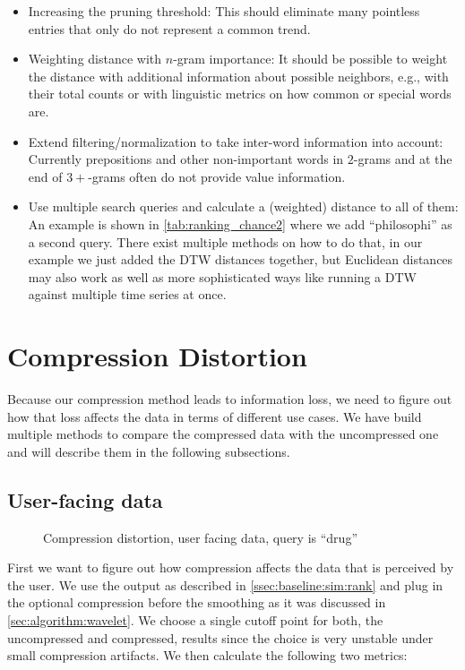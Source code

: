 \begin{itemize}
    \item Increasing the pruning threshold: This should eliminate many pointless entries that only do not represent a common trend.
    \item Weighting distance with $n$-gram importance: It should be possible to weight the distance with additional information about possible neighbors, e.g., with their total counts or with linguistic metrics on how common or special words are.
    \item Extend filtering/normalization to take inter-word information into account: Currently prepositions and other non-important words in $2$-grams and at the end of $3+$-grams often do not provide value information.
    \item Use multiple search queries and calculate a (weighted) distance to all of them: An example is shown in \autoref{tab:ranking_chance2} where we add \enquote{philosophi} as a second query. There exist multiple methods on how to do that, in our example we just added the DTW distances together, but Euclidean distances may also work as well as more sophisticated ways like running a DTW against multiple time series at once.
\end{itemize}



\section{Compression Distortion}
\label{sec:evaluation:distortion}

Because our compression method leads to information loss, we need to figure out how that loss affects the data in terms of different use cases. We have build multiple methods to compare the compressed data with the uncompressed one and will describe them in the following subsections.


\subsection{User-facing data}
\label{ssec:evaluation:distortion:user}

\begin{figure}
    \centering
    
    \caption{Compression distortion, user facing data, query is \enquote{drug}}\label{fig:compression}
\end{figure}

First we want to figure out how compression affects the data that is perceived by the user. We use the output as described in \autoref{ssec:baseline:sim:rank} and plug in the optional compression before the smoothing as it was discussed in \autoref{sec:algorithm:wavelet}. We choose a single cutoff point for both, the uncompressed and compressed, results since the choice is very unstable under small compression artifacts. We then calculate the following two metrics:

